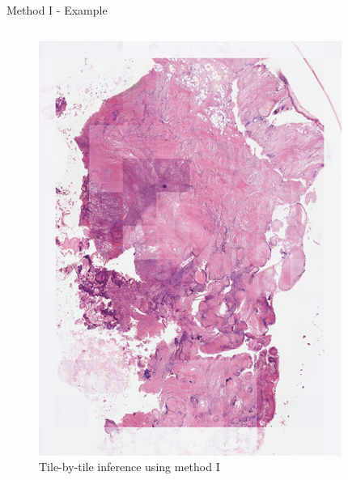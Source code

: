 \documentclass[t]{beamer}
\begin{document}
\begin{frame}{Method I - Example}
\begin{columns}
\begin{column}{0.5\textwidth}
\begin{figure}
\centering
\includegraphics[width=0.75\linewidth]{scan6-no-overlap}
\caption{Tile-by-tile inference using method I}
\end{figure}
\end{column}

\end{columns}

\end{frame}
\end{document}

